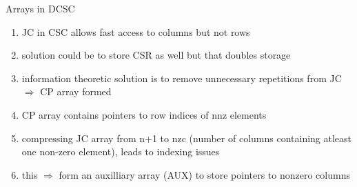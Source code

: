 \documentclass[12pt, usenames, dvipsnames, table]{beamer}
\begin{document}
\begin{frame}{Arrays in DCSC}
	\begin{enumerate}
		\item JC in CSC allows fast access to columns but not rows
		\item solution could be to store CSR as well but that doubles storage
		\item information theoretic solution is to remove unnecessary repetitions from JC $\Rightarrow$ CP array formed
		\item CP array contains pointers to row indices of nnz elements
		\item compressing JC array from n+1 to nzc (number of columns containing atleast one non-zero element), leads to indexing issues
		\item this $\Rightarrow$ form an auxilliary array (AUX) to store pointers to nonzero columns
	\end{enumerate}
\end{frame}
\end{document}
